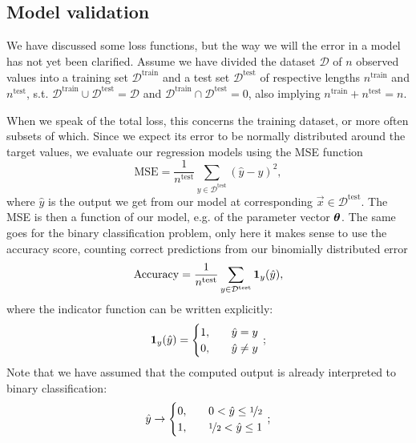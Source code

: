 \subsection{Model validation}\label{sec:validation}

We have discussed some loss functions, but the way we will  the error in a model has not yet been clarified. Assume we have divided the dataset $\mathcal{D}$ of $n$ observed values into a training set $\mathcal{D}^\mathrm{train}$ and a test set $\mathcal{D}^\mathrm{test}$ of respective lengths $n^\mathrm{train}$ and $n^\mathrm{test}$, s.t. $ \mathcal{D}^\mathrm{train} \cup\mathcal{D}^\mathrm{test} = \mathcal{D}$ and $\mathcal{D}^\mathrm{train} \cap\mathcal{D}^\mathrm{test} = 0 $, also implying $n^\mathrm{train}+n^\mathrm{test}=n$.

When we speak of the total loss, this concerns the training dataset, or more often subsets of which. Since we expect its error to be normally distributed around the target values, we evaluate our regression models using the MSE function
\begin{equation}\label{eq:MSE}
    \mathrm{MSE} = \frac{1}{n^\mathrm{test}} \sum_{y\in \mathcal{D}^\mathrm{test}} (\hat{y} - y)^2,
\end{equation}
where $\hat{y}$ is the output we get from our model at corresponding $\vec{x}\in\mathcal{D}^\mathrm{test}$. The MSE is then a function of our model, e.g. of the parameter vector $\boldsymbol{\theta}$. The same goes for the binary classification problem, only here it makes sense to use the accuracy score, counting correct predictions from our binomially distributed error
\begin{equation}\label{eq:accuracy}
    \mathrm{Accuracy} = \frac{1}{n^\mathrm{test}} \sum_{y\in \mathcal{D}^\mathrm{test}} \boldsymbol{1}_{y}(\hat{y}),
\end{equation}
where the indicator function can be written explicitly:
\begin{equation}\label{eq:indicator}
    \boldsymbol{1}_y(\hat{y}) = \begin{cases}
        1, \quad & \hat{y} = y \\
        0, \quad & \hat{y} \neq y
    \end{cases}\, ;
\end{equation}
Note that we have assumed that the computed output is already interpreted to binary classification:
\begin{equation}\label{eq:binary_y}
    \hat{y} \to \begin{cases}
        0, \quad & 0 <\hat{y} \leq \nicefrac{1}{2} \\
        1, \quad & \nicefrac{1}{2} < \hat{y} \leq 1
    \end{cases}\, ;
\end{equation}
